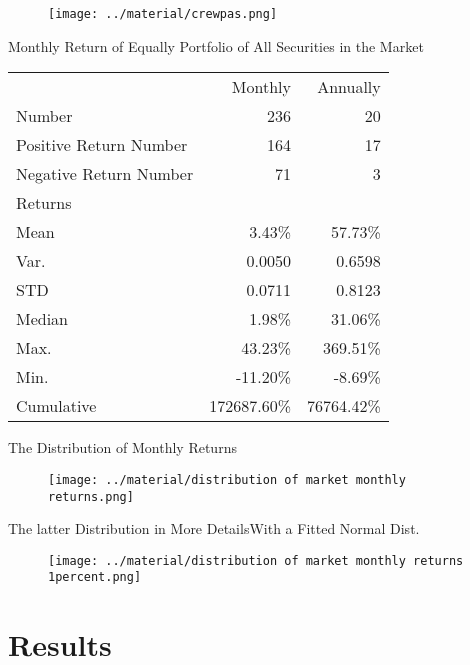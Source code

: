 \documentclass[aspectratio=169]{beamer}
\begin{document}
	\begin{frame}
		\begin{figure}
			\texttt{[image: ../material/crewpas.png]}
		\end{figure}
	\end{frame}


	\begin{frame}{Monthly Return of Equally Portfolio of All Securities in the Market}
		\begin{center}
		\begin{tabular}{l r r}
			 & Monthly & Annually \\ \cline{2-3}
			Number & 236 & 20   \\
			Positive Return Number & 164 & 17  \\
			Negative Return Number & 71 & 3 \\ \hline
			Returns &&  \\ \hline
			Mean &3.43\%& 57.73\% \\
			Var. & 0.0050 & 0.6598 \\
			STD & 0.0711 & 0.8123 \\
			Median & 1.98\% & 31.06\% \\
			Max. & 43.23\% & 369.51\% \\
			Min. & -11.20\% & -8.69\% \\
			Cumulative  & 172687.60\% & 76764.42\% \\

		\end{tabular}
	\end{center}
	\end{frame}

	\begin{frame}{The Distribution of Monthly Returns}
		\begin{figure}
			\texttt{[image: ../material/distribution of market monthly returns.png]}
		\end{figure}
	\end{frame}

	\begin{frame}{The latter Distribution in More Details}{With a Fitted Normal Dist.}
		\begin{figure}
			\texttt{[image: ../material/distribution of market monthly returns 1percent.png]}
		\end{figure}
	\end{frame}

\section{Results}
\end{document}
